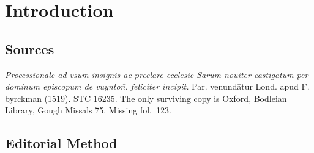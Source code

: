 \chapter{Introduction}

\section{Sources}

\textit{Processionale ad vsum insignis ac preclare ecclesie Sarum nouiter castigatum per dominum episcopum de vuynton̄. feliciter incipit.} Par. venundātur Lond. apud F. byrckman (1519). STC 16235. The only surviving copy is Oxford, Bodleian Library, Gough Missals 75. Missing fol.~123.

\section{Editorial Method}


